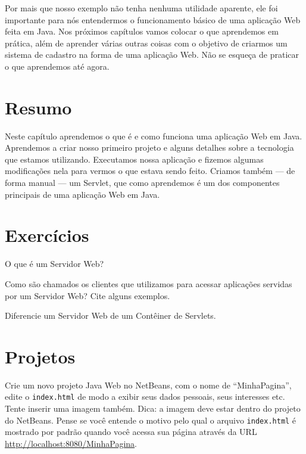 Por mais que nosso exemplo não tenha nenhuma utilidade aparente, ele foi importante para nós entendermos o funcionamento básico de uma aplicação Web feita em Java. Nos próximos capítulos vamos colocar o que aprendemos em prática, além de aprender várias outras coisas com o objetivo de criarmos um sistema de cadastro na forma de uma aplicação Web. Não se esqueça de praticar o que aprendemos até agora. 


\section{Resumo}

Neste capítulo aprendemos o que é e como funciona uma aplicação Web em Java. Aprendemos a criar nosso primeiro projeto e alguns detalhes sobre a tecnologia que estamos utilizando. Executamos nossa aplicação e fizemos algumas modificações nela para vermos o que estava sendo feito. Criamos também --- de forma manual --- um Servlet, que como aprendemos é um dos componentes principais de uma aplicação Web em Java.


\section{Exercícios}

\begin{exercicioSemArquivo}{}{}{}
    O que é um Servidor Web?
\end{exercicioSemArquivo}

\begin{exercicioSemArquivo}{}{}{}
    Como são chamados os clientes que utilizamos para acessar aplicações servidas por um Servidor Web? Cite alguns exemplos.
\end{exercicioSemArquivo}

\begin{exercicioSemArquivo}{}{}{}
    Diferencie um Servidor Web de um Contêiner de Servlets.
\end{exercicioSemArquivo}


\section{Projetos}

\begin{projetoSemArquivo}{}{}{}
    Crie um novo projeto Java Web no NetBeans, com o nome de ``MinhaPagina'', edite o \texttt{index.html} de modo a exibir seus dados pessoais, seus interesses etc. Tente inserir uma imagem também. Dica: a imagem deve estar dentro do projeto do NetBeans. Pense se você entende o motivo pelo qual o arquivo \texttt{index.html} é mostrado por padrão quando você acessa sua página através da URL \url{http://localhost:8080/MinhaPagina}.
\end{projetoSemArquivo}

